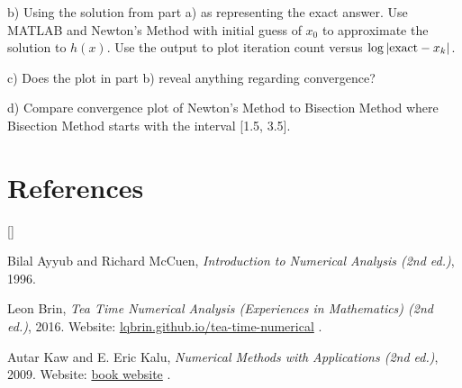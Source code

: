 \documentclass{article}
\def\beginrefs{\begin{list}%
        {[\arabic{equation}]}{\usecounter{equation}
         \setlength{\leftmargin}{2.0truecm}\setlength{\labelsep}{0.4truecm}%
         \setlength{\labelwidth}{1.6truecm}}}
\def\endrefs{\end{list}}
\def\bibentry#1{\item[\hbox{[#1]}]}
\begin{document}
b) Using the solution from part a) as representing the exact answer. Use MATLAB and Newton's Method with initial guess of $x_0$ to approximate the solution to $h(x)$. Use the output to plot iteration count versus $\log \vert {\rm exact}-x_k \vert$. \smallskip \par

c) Does the plot in part b) reveal anything regarding convergence?  \smallskip \par


d) Compare convergence plot of Newton's Method to Bisection Method where Bisection Method starts with the interval [1.5, 3.5]. 

\section*{References}
\beginrefs

\bibentry{AM96}{\sc Bilal Ayyub} and {\sc Richard McCuen},
{\it Introduction to Numerical Analysis (2nd ed.)}, 1996. 

\bibentry{LB16}{\sc Leon Brin},
{\it Tea Time Numerical Analysis (Experiences in Mathematics)  (2nd ed.)}, 2016. Website: \href{http://lqbrin.github.io/tea-time-numerical/}{lqbrin.github.io/tea-time-numerical} .

\bibentry{KK09} {\sc Autar Kaw} and {\sc E. Eric Kalu}, {\it Numerical Methods with Applications (2nd ed.)}, 2009. Website: \href{http://autarkaw.com/books/numericalmethods/index.html}{book website} .

\endrefs
\end{document}
